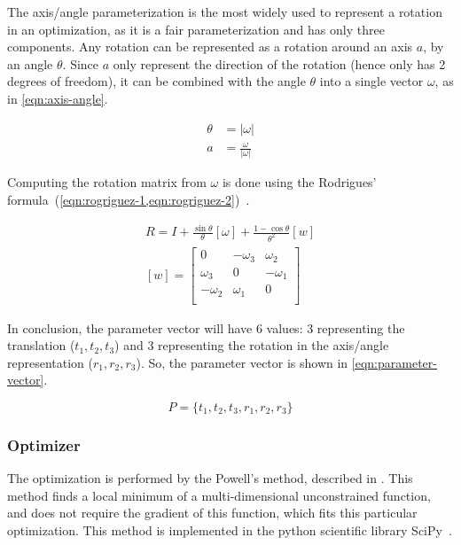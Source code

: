 The axis/angle parameterization is the most widely used to represent a rotation in an optimization, as it is a fair parameterization and has only three components. Any rotation can be represented as a rotation around an axis $a$, by an angle $\theta$. Since $a$ only represent the direction of the rotation (hence only has 2 degrees of freedom), it can be combined with the angle $\theta$ into a single vector $\omega$, as in \cref{eqn:axis-angle}.

\begin{equation}
    \label{eqn:axis-angle}
    \begin{aligned}
        \theta & = |\omega| \\
        a & = \frac{\omega}{|\omega|}
    \end{aligned}
\end{equation}

Computing the rotation matrix from $\omega$ is done using the Rodrigues' formula~(\cref{eqn:rogriguez-1,eqn:rogriguez-2})~\cite{schmidt01}.

\begin{align}
    \label{eqn:rogriguez-1}
    R = I + \frac{\sin \theta}{\theta} [\omega] + \frac{1 - \cos \theta}{\theta^2} [w] \\
    \label{eqn:rogriguez-2}
    [w] = \left[
        \begin{array}{ccc}
            0  & -\omega_3 & \omega_2 \\
            \omega_3 & 0   & -\omega_1 \\
            -\omega_2 & \omega_1 & 0 \\
        \end{array}
    \right]
\end{align}

In conclusion, the parameter vector will have 6 values: 3 representing the translation ($t_1, t_2, t_3$) and 3 representing the rotation in the axis/angle representation ($r_1, r_2, r_3$). So, the parameter vector is shown in \cref{eqn:parameter-vector}.

\begin{equation}
    \label{eqn:parameter-vector}
    P = \{t_1, t_2, t_3, r_1, r_2, r_3\}
\end{equation}

\subsubsection{Optimizer}

The optimization is performed by the Powell's method, described in \cite{powell_method}. This method finds a local minimum of a multi-dimensional unconstrained function, and does not require the gradient of this function, which fits this particular optimization. This method is implemented in the python scientific library SciPy~\cite{scipy-powell}.

